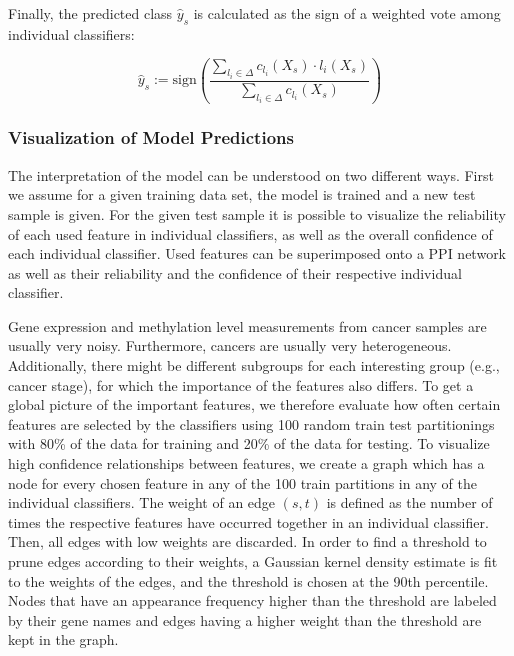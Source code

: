 \noindent Finally, the predicted class $\hat{y}_s$ is calculated as the sign of a weighted vote among individual classifiers:

\begin{equation}
\hat{y}_s := \textrm{sign}\left(\frac{\sum_{l_i \in \Delta} c_{l_i}(X_s) \cdot l_i(X_s)}{\sum_{l_i \in \Delta} c_{l_i}(X_s)}\right)
\end{equation}

\subsubsection{Visualization of Model Predictions}
\label{sec:visualization-of-model-predictions}
The interpretation of the model can be understood on two different ways. First we assume for a given training data set, the model is trained and a new test sample is given.
For the given test sample it is possible to visualize the reliability of each used feature in individual classifiers, as well as the overall confidence of each individual classifier. 
Used features can be superimposed onto a PPI network as well as their reliability and the confidence of their respective individual classifier.

\noindent Gene expression and methylation level measurements from cancer samples are usually very noisy. Furthermore, cancers are usually very heterogeneous. Additionally, there might be different subgroups for each interesting group (e.g., cancer stage), for which the importance of the features also differs. To get a global picture of the important features, we therefore evaluate how often certain features are selected by the classifiers using 100 random train test partitionings with 80\% of the data for training and 20\% of the data for testing. 
 To visualize high confidence relationships between features, we create a graph which has a node for every chosen feature in any of the 100 train partitions in any of the individual classifiers. The weight of an edge $(s, t)$ is defined as the number of times the respective features have occurred together in an individual classifier. Then, all edges with low weights are discarded. In order to find a threshold to prune edges according to their weights, a Gaussian kernel density estimate is fit to the weights of the edges, and the threshold is chosen at the 90th percentile. Nodes that have an appearance frequency higher than the threshold are labeled by their gene names and edges having a higher weight than the threshold are kept in the graph.

